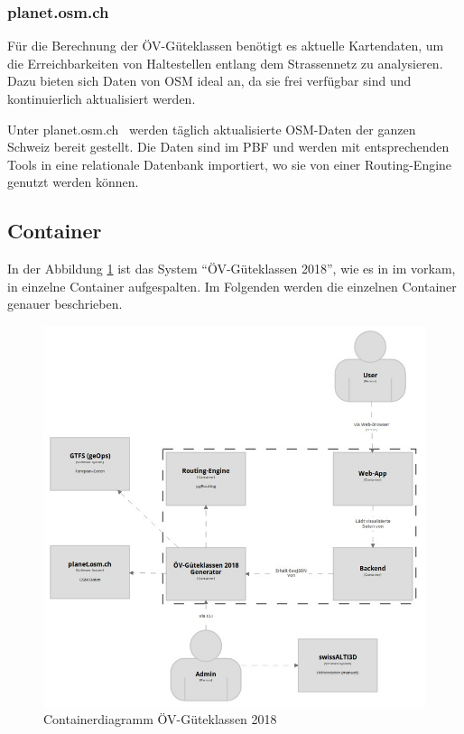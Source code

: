 \subsubsection{planet.osm.ch}
\label{subsystem:planet.osm.ch}

Für die Berechnung der ÖV-Güteklassen benötigt es aktuelle Kartendaten, um die Erreichbarkeiten von Haltestellen entlang dem Strassennetz zu analysieren.
Dazu bieten sich Daten von \ac{OSM} ideal an, da sie frei verfügbar sind und kontinuierlich aktualisiert werden.

Unter planet.osm.ch~\cite{planet_osm_ch} werden täglich aktualisierte \ac{OSM}-Daten der ganzen Schweiz bereit gestellt.
Die Daten sind im \ac{PBF} und werden mit entsprechenden Tools in eine relationale Datenbank importiert, wo sie von einer Routing-Engine genutzt werden können.


\subsection{Container}
\label{Architektur:Container}

In der Abbildung \ref{fig:container-diagram} ist das System "`ÖV-Güteklassen 2018"', wie es in im  vorkam, in einzelne Container aufgespalten.
Im Folgenden werden die einzelnen Container genauer beschrieben.

\begin{figure}[ht]
    \centering
    \includegraphics[width=0.8\linewidth]{projectdoc/img/container-diagram.png}
    \caption[Containerdiagramm]{Containerdiagramm ÖV-Güteklassen 2018}
    \label{fig:container-diagram}
\end{figure}

